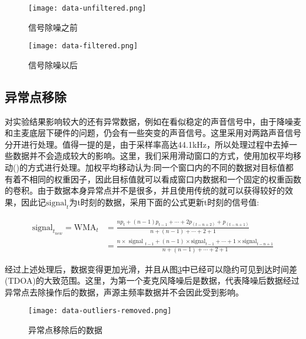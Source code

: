 \documentclass[winfonts,oneside]{njuthesis}
\begin{document}
			
			\begin{figure}[H]
				\centering
				\texttt{[image: data-unfiltered.png]}
				\caption{信号除噪之前}
				\label{fig: data-unfiltered}
			\end{figure}
		
			\begin{figure}[H]
				\centering
				\texttt{[image: data-filtered.png]}
				\caption{信号除噪以后}
				\label{fig: data-filtered}
			\end{figure}
					
		\subsection{异常点移除}
		
			对实验结果影响较大的还有异常数据，例如在看似稳定的声音信号中，由于降噪麦和主麦底层下硬件的问题，仍会有一些突变的声音信号。这里采用对两路声音信号分开进行处理。值得一提的是，由于采样率高达44.1kHz，所以处理过程中去掉一些数据并不会造成较大的影响。这里，我们采用滑动窗口的方式，使用加权平均移动(\cite{Moving_average})的方式进行处理。加权平均移动认为:同一个窗口内的不同的数据对目标值都有着不相同的权重因子，因此目标值就可以看成窗口内数据和一个固定的权重函数的卷积。由于数据本身异常点并不是很多，并且使用传统的就可以获得较好的效果，因此记$\text{signal}_t$为t时刻的数据，采用下面的公式更新t时刻的信号值:
			
			\begin{equation}
			\begin{aligned}
				\text{signal}_{t_{new}} = \text{WMA}_{t}&=\frac{n p_{t}+(n-1) p_{t-1}+\cdots+2 p_{(t-n+2)}+p_{(t-n+1)}}{n+(n-1)+\cdots+2+1}\\
											  &=\frac{n \times \text { signal }_{t-1}+(n-1) \times \text {signal}_{t-1}+\cdots+1 \times \text {signal}_{t-n+1}}{n+(n-1)+\cdots+2+1}								 
			\end{aligned}
			\end{equation}
			
			经过上述处理后，数据变得更加光滑，并且从图\ref{fig: data-outliers-removed}中已经可以隐约可见到达时间差(TDOA)的大致范围。这里，为第一个麦克风降噪后是数据，代表降噪后数据经过异常点去除操作后的数据，声源主频率数据并不会因此受到影响。
			
			\begin{figure}[H]
				\centering
				\texttt{[image: data-outliers-removed.png]} 
				\caption{异常点移除后的数据}
				\label{fig: data-outliers-removed}
			\end{figure}
		
\end{document}
